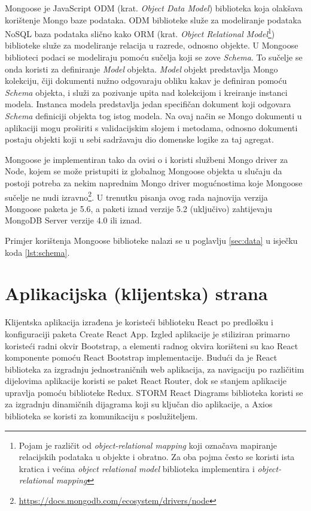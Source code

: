 \documentclass[times, utf8, diplomski, numeric]{fer}
\begin{document}
Mongoose je JavaScript ODM (krat. \emph{Object Data Model}) biblioteka koja olakšava korištenje Mongo baze podataka.
ODM biblioteke služe za modeliranje podataka NoSQL baza podataka slično kako ORM (krat. \emph{Object Relational Model}\footnote{
    Pojam je različit od \emph{object-relational mapping} koji označava mapiranje relacijskih podataka u objekte i obratno. Za oba pojma često se koristi ista kratica i većina \emph{object relational model} biblioteka implementira i \emph{object-relational mapping}
}) biblioteke služe za modeliranje relacija u razrede, odnosno objekte. U Mongoose biblioteci podaci se modeliraju pomoću sučelja koji se zove \emph{Schema}.
To sučelje se onda koristi za definiranje \emph{Model} objekta.
\emph{Model} objekt predstavlja Mongo kolekciju, čiji dokumenti nužno odgovaraju obliku kakav je definiran pomoću \emph{Schema} objekta, i služi za pozivanje upita nad kolekcijom i kreiranje instanci modela.
Instanca modela predstavlja jedan specifičan dokument koji odgovara \emph{Schema} definiciji objekta tog istog modela.
Na ovaj način se Mongo dokumenti u aplikaciji mogu proširiti s validacijskim slojem i metodama, odnosno dokumenti postaju objekti koji u sebi sadržavaju dio domenske logike za taj agregat\citep{mongoose}.

Mongoose je implementiran tako da ovisi o i koristi službeni Mongo driver za Node, kojem se može pristupiti iz globalnog Mongoose objekta u slučaju da postoji potreba za nekim naprednim Mongo driver mogućnostima koje Mongoose sučelje ne nudi izravno\footnote{\url{https://docs.mongodb.com/ecosystem/drivers/node}}.
U trenutku pisanja ovog rada najnovija verzija Mongoose paketa je 5.6, a paketi iznad verzije 5.2 (uključivo) zahtijevaju MongoDB Server verzije 4.0 ili iznad.

Primjer korištenja Mongoose biblioteke nalazi se u poglavlju \ref{sec:data} u isječku koda \ref{lst:schema}.


\newpage
\section{Aplikacijska (klijentska) strana}

Klijentska aplikacija izrađena je koristeći biblioteku React po predlošku i konfiguraciji paketa Create React App.
Izgled aplikacije je stiliziran primarno koristeći radni okvir  Bootstrap, a elementi radnog okvira korišteni su kao React komponente pomoću React Bootstrap implementacije.
Budući da je React biblioteka za izgradnju jednostraničnih  web aplikacija, za navigaciju po različitim dijelovima aplikacije koristi se paket React Router, dok se stanjem aplikacije upravlja pomoću biblioteke Redux.
STORM React Diagrams biblioteka koristi se za izgradnju dinamičnih dijagrama koji su ključan dio aplikacije, a Axios biblioteka se koristi za komunikaciju s poslužiteljem.
\end{document}
